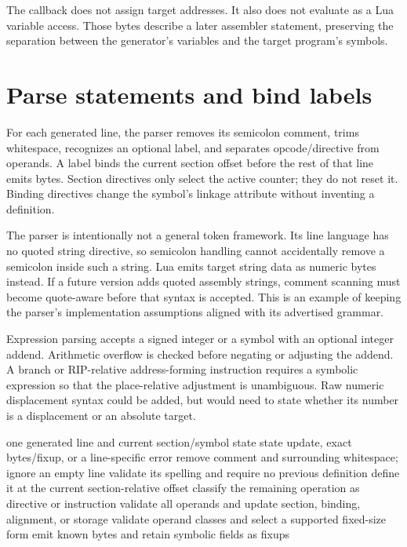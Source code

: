The callback does not assign target addresses.
It also does not evaluate  as a Lua variable access.
Those bytes describe a later assembler statement, preserving the separation between the generator's variables and the target program's symbols.

\section{Parse statements and bind labels}
\label{sec:ch56-parser}

For each generated line, the parser removes its semicolon comment, trims whitespace, recognizes an optional label, and separates opcode/directive from operands.
A label binds the current section offset before the rest of that line emits bytes.
Section directives only select the active counter; they do not reset it.
Binding directives change the symbol's linkage attribute without inventing a definition.

The parser is intentionally not a general token framework.
Its line language has no quoted string directive, so semicolon handling cannot accidentally remove a semicolon inside such a string.
Lua emits target string data as numeric bytes instead.
If a future version adds quoted assembly strings, comment scanning must become quote-aware before that syntax is accepted.
This is an example of keeping the parser's implementation assumptions aligned with its advertised grammar.

Expression parsing accepts a signed integer or a symbol with an optional integer addend.
Arithmetic overflow is checked before negating or adjusting the addend.
A branch or RIP-relative address-forming instruction requires a symbolic expression so that the place-relative adjustment is unambiguous.
Raw numeric displacement syntax could be added, but would need to state whether its number is a displacement or an absolute target.

\begin{algorithm}[htbp]
\caption{Assemble one line under the case-study grammar.}
\label{alg:ch56-line}
\begin{pseudocode}
\Require one generated line and current section/symbol state
\Ensure state update, exact bytes/fixup, or a line-specific error
\State remove comment and surrounding whitespace; ignore an empty line
  \State validate its spelling and require no previous definition
  \State define it at the current section-relative offset
\EndIf
\State classify the remaining operation as directive or instruction
  \State validate all operands and update section, binding, alignment, or storage
\Else
  \State validate operand classes and select a supported fixed-size form
  \State emit known bytes and retain symbolic fields as fixups
\EndIf
\end{pseudocode}
\end{algorithm}

